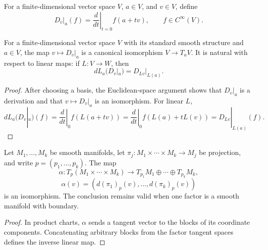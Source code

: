 \begin{definition}
\label{def:3-14-extra-2}



For a finite-dimensional vector space $V$, $a\in V$, and $v\in V$, define
\[
D_v|_a(f)=\left.\frac{d}{dt}\right|_{t=0}f(a+tv),
\qquad f\in C^\infty(V). \tag{3.5}
\]
\end{definition}

\begin{proposition}
\label{prop:3-13}




For a finite-dimensional vector space $V$ with its standard smooth structure
and $a\in V$, the map $v\mapsto D_v|_a$ is a canonical isomorphism
$V\to T_aV$. It is natural with respect to linear maps: if $L:V\to W$, then
\[
dL_a(D_v|_a)=D_{Lv}|_{L(a)}. \tag{3.6}
\]
\end{proposition}

\begin{proof}

\sketch
After choosing a basis, the Euclidean-space argument shows that $D_v|_a$ is
a derivation and that $v\mapsto D_v|_a$ is an isomorphism. For linear $L$,
\[
dL_a(D_v|_a)(f)
=\left.\frac{d}{dt}\right|_{0}f(L(a+tv))
=\left.\frac{d}{dt}\right|_{0}f(L(a)+tL(v))
=D_{Lv}|_{L(a)}(f).
\]
\end{proof}

\begin{proposition}
\label{prop:3-14}




Let $M_1,\ldots,M_k$ be smooth manifolds, let
$\pi_j:M_1\times\cdots\times M_k\to M_j$ be projection, and write
$p=(p_1,\ldots,p_k)$. The map
\[
\alpha:T_p(M_1\times\cdots\times M_k)
\longrightarrow T_{p_1}M_1\oplus\cdots\oplus T_{p_k}M_k,
\]
\[
\alpha(v)=(d(\pi_1)_p(v),\ldots,d(\pi_k)_p(v)) \tag{3.7}
\]
is an isomorphism. The conclusion remains valid when one factor is a smooth
manifold with boundary.
\end{proposition}

\begin{proof}

\sketch In product charts, $\alpha$ sends a tangent vector to the blocks of its
coordinate components. Concatenating arbitrary blocks from the factor tangent
spaces defines the inverse linear map.
\end{proof}


